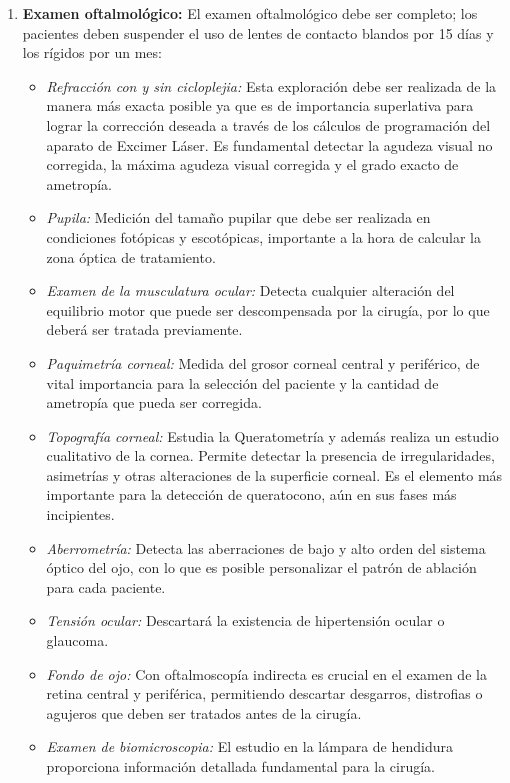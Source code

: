 \begin{itemize}
\begin{enumerate}
        \item \textbf{Examen oftalmológico: }El examen oftalmológico debe ser completo; los pacientes deben suspender el uso de lentes de contacto blandos por 15 días y los rígidos por un mes:
        \begin{itemize}
            \item \textsl{Refracción con y sin cicloplejia:} Esta exploración debe ser realizada de la manera más exacta posible ya que es de importancia superlativa para lograr la corrección deseada a través de los cálculos de programación del aparato de Excimer Láser. Es fundamental detectar la agudeza visual no corregida, la máxima agudeza visual corregida y el grado exacto de ametropía.
            \item \textsl{Pupila:} Medición del tamaño pupilar que debe ser realizada en condiciones fotópicas y escotópicas, importante a la hora de calcular la zona óptica de tratamiento.
            \item \textsl{Examen de la musculatura ocular:} Detecta cualquier alteración del equilibrio motor que puede ser descompensada por la cirugía, por lo que deberá ser tratada previamente.
            \item \textsl{Paquimetría corneal:} Medida del grosor corneal central y periférico, de vital importancia para la selección del paciente y la cantidad de ametropía que pueda ser corregida.
            \item \textsl{Topografía corneal:} Estudia la Queratometría y además realiza un estudio cualitativo de la cornea. Permite detectar la presencia de irregularidades, asimetrías y otras alteraciones de la superficie corneal. Es el elemento más importante para la detección de queratocono, aún en sus fases más incipientes.
            \item \textsl{Aberrometría:} Detecta las aberraciones de bajo y alto orden del sistema óptico del ojo, con lo que es posible personalizar el patrón de ablación para cada paciente.
            \item \textsl{Tensión ocular: }Descartará la existencia de hipertensión ocular o glaucoma.
            \item \textsl{Fondo de ojo: }Con oftalmoscopía indirecta es crucial en el examen de la retina central y periférica, permitiendo descartar desgarros, distrofias o agujeros que deben ser tratados antes de la cirugía.
            \item \textsl{Examen de biomicroscopia: }El estudio en la lámpara de hendidura proporciona información detallada fundamental para la cirugía.

\end{itemize}
\end{enumerate}
\end{itemize}
